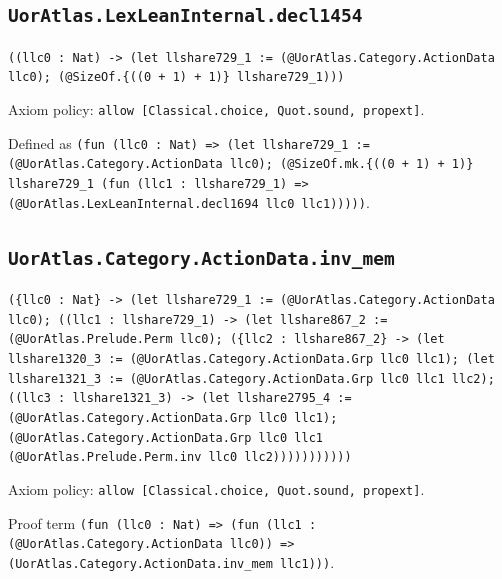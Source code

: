 \documentclass[11pt]{article}
\begin{document}
\subsection*{\texttt{UorAtlas.LexLeanInternal.decl1454}}
\noindent\texttt{((llc0 : Nat) -> (let llshare729\_1 := (@UorAtlas.Category.ActionData llc0); (@SizeOf.\{((0 + 1) + 1)\} llshare729\_1)))}\par
\noindent Axiom policy: \texttt{allow [Classical.choice, Quot.sound, propext]}.\par
\noindent Defined as \texttt{(fun (llc0 : Nat) => (let llshare729\_1 := (@UorAtlas.Category.ActionData llc0); (@SizeOf.mk.\{((0 + 1) + 1)\} llshare729\_1 (fun (llc1 : llshare729\_1) => (@UorAtlas.LexLeanInternal.decl1694 llc0 llc1)))))}.\par
\subsection*{\texttt{UorAtlas.Category.ActionData.inv\_mem}}
\noindent\texttt{(\{llc0 : Nat\} -> (let llshare729\_1 := (@UorAtlas.Category.ActionData llc0); ((llc1 : llshare729\_1) -> (let llshare867\_2 := (@UorAtlas.Prelude.Perm llc0); (\{llc2 : llshare867\_2\} -> (let llshare1320\_3 := (@UorAtlas.Category.ActionData.Grp llc0 llc1); (let llshare1321\_3 := (@UorAtlas.Category.ActionData.Grp llc0 llc1 llc2); ((llc3 : llshare1321\_3) -> (let llshare2795\_4 := (@UorAtlas.Category.ActionData.Grp llc0 llc1); (@UorAtlas.Category.ActionData.Grp llc0 llc1 (@UorAtlas.Prelude.Perm.inv llc0 llc2)))))))))))}\par
\noindent Axiom policy: \texttt{allow [Classical.choice, Quot.sound, propext]}.\par
\noindent Proof term \texttt{(fun (llc0 : Nat) => (fun (llc1 : (@UorAtlas.Category.ActionData llc0)) => (UorAtlas.Category.ActionData.inv\_mem llc1)))}.\par
\end{document}
